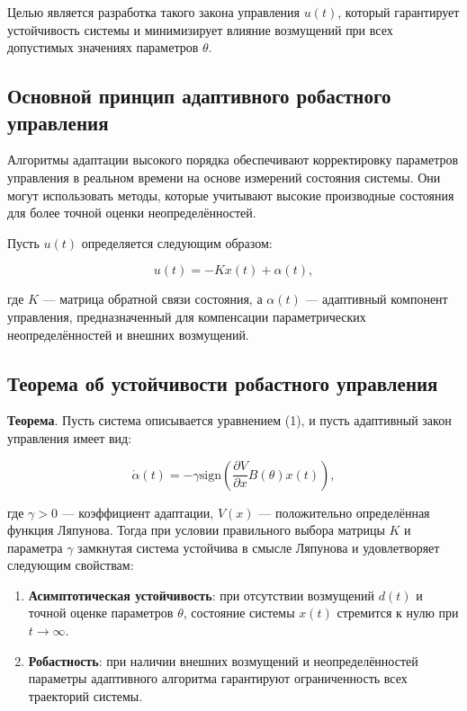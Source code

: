 \documentclass[a4paper,14pt]{extarticle} %
\begin{document}
Целью является разработка такого закона управления \( u(t) \), который гарантирует устойчивость системы и минимизирует влияние возмущений при всех допустимых значениях параметров \( \theta \).

\subsection*{Основной принцип адаптивного робастного управления}

Алгоритмы адаптации высокого порядка обеспечивают корректировку параметров управления в реальном времени на основе измерений состояния системы. Они могут использовать методы, которые учитывают высокие производные состояния для более точной оценки неопределённостей.

Пусть \( u(t) \) определяется следующим образом:

\begin{equation}
    u(t) = -Kx(t) + \alpha(t),
\end{equation}

где \( K \) — матрица обратной связи состояния, а \( \alpha(t) \) — адаптивный компонент управления, предназначенный для компенсации параметрических неопределённостей и внешних возмущений.

\subsection*{Теорема об устойчивости робастного управления}

\textbf{Теорема}. Пусть система описывается уравнением (1), и пусть адаптивный закон управления имеет вид:

\begin{equation}
    \dot{\alpha}(t) = -\gamma \text{sign}\left( \frac{\partial V}{\partial x} B(\theta)x(t) \right),
\end{equation}

где \( \gamma > 0 \) — коэффициент адаптации, \( V(x) \) — положительно определённая функция Ляпунова. Тогда при условии правильного выбора матрицы \( K \) и параметра \( \gamma \) замкнутая система устойчива в смысле Ляпунова и удовлетворяет следующим свойствам:

\begin{enumerate}
    \item \textbf{Асимптотическая устойчивость}: при отсутствии возмущений \( d(t) \) и точной оценке параметров \( \theta \), состояние системы \( x(t) \) стремится к нулю при \( t \to \infty \).
    \item \textbf{Робастность}: при наличии внешних возмущений и неопределённостей параметры адаптивного алгоритма гарантируют ограниченность всех траекторий системы.
\end{enumerate}
\end{document}
